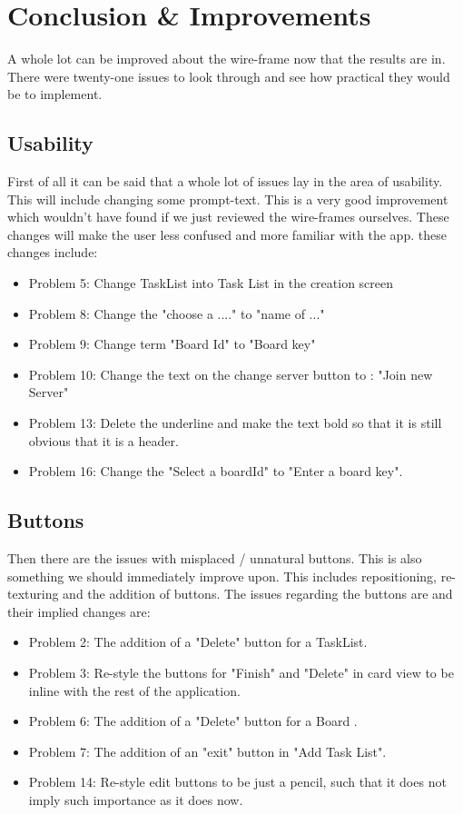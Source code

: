 \section{Conclusion \& Improvements}
A whole lot can be improved about the wire-frame now that the results are in. There were twenty-one issues to look through and see how practical they would be to implement.

\subsection{Usability}
First of all it can be said that a whole lot of issues lay in the area of usability. This will include changing some prompt-text. This is a very good improvement which wouldn't have found if we just reviewed the wire-frames ourselves. These changes will make the user less confused and more familiar with the app. 
these changes include:
\begin{itemize}
    \item Problem 5: Change TaskList into Task List in the creation screen
    \item Problem 8: Change the "choose a ...." to "name of ..."
    \item Problem 9: Change term "Board Id" to "Board key"
    \item Problem 10: Change the text on the change server button to : "Join new Server"
    \item Problem 13: Delete the underline and make the text bold so that it is still obvious that it is a header.
    \item Problem 16: Change the "Select a boardId" to "Enter a board key".
\end{itemize}

\subsection{Buttons}
Then there are the issues with misplaced / unnatural buttons. This is also something we should immediately improve upon. This includes repositioning, re-texturing and the addition of buttons. 
The issues regarding the buttons are and their implied changes are: 
\begin{itemize}
    \item Problem 2: The addition of a "Delete" button for a TaskList.
    \item Problem 3: Re-style the buttons for "Finish" and "Delete" in card view to be inline with the rest of the application.
    \item Problem 6: The addition of a "Delete" button for a Board .
    \item Problem 7: The addition of an "exit" button in "Add Task List".
    \item Problem 14: Re-style edit buttons to be just a pencil, such that it does not imply such importance as it does now. 
\end{itemize}
\newpage
